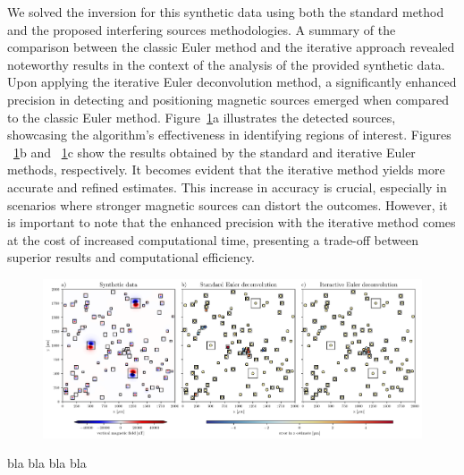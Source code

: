 We solved the inversion for this synthetic data using both the standard method \citep{Souza-Junior2023b} and the proposed interfering sources methodologies. A summary of the comparison between the classic Euler method and the iterative approach revealed noteworthy results in the context of the analysis of the provided synthetic data. Upon applying the iterative Euler deconvolution method, a significantly enhanced precision in detecting and positioning magnetic sources emerged when compared to the classic Euler method. Figure~\ref{euler1}a illustrates the detected sources, showcasing the algorithm's effectiveness in identifying regions of interest. Figures ~\ref{euler1}b and ~\ref{euler1}c show the results obtained by the standard and iterative Euler methods, respectively. It becomes evident that the iterative method yields more accurate and refined estimates. This increase in accuracy is crucial, especially in scenarios where stronger magnetic sources can distort the outcomes. However, it is important to note that the enhanced precision with the iterative method comes at the cost of increased computational time, presenting a trade-off between superior results and computational efficiency.


\begin{figure}[tb!]
  \centering
  \includegraphics[width=1\linewidth]{figures/euler-comparion-1.png}
  \caption{
      }
  \label{euler1}
\end{figure}

bla bla bla bla

